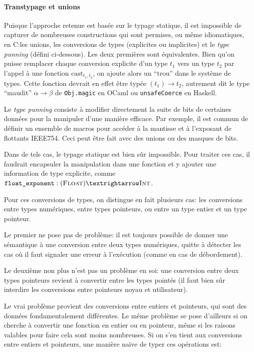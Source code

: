 \paragraph{Transtypage et unions}

Puisque l'approche retenue est basée sur le typage statique, il est impossible
de capturer de nombreuses constructions qui sont permises, ou même idiomatiques,
en C:\@ les unions, les conversions de types (explicites ou implicites) et le
\emph{type punning} (défini ci-dessous). Les deux premières sont équivalentes.
Bien qu'on puisse remplacer chaque conversion explicite d'un type $t_1$ vers un
type $t_2$ par l'appel à une fonction $\mathrm{cast}_{t_1,t_2}$, on ajoute alors
un \enquote{trou} dans le système de types. Cette fonction devrait en effet être
typée $(t_1) → t_2$, autrement dit le type \enquote{maudit} $α → β$ de
\texttt{Obj.magic} en OCaml ou \texttt{unsafeCoerce} en Haskell.

Le \emph{type punning} consiste à modifier directement la suite de bits de
certaines données pour la manipuler d'une manière efficace. Par exemple, il est
commun de définir un ensemble de macros pour accéder à la mantisse et à
l'exposant de flottants IEEE754. Ceci peut être fait avec des unions ou des
masques de bits.

Dans de tels cas, le typage statique est bien sûr impossible. Pour traiter ces
cas, il faudrait encapsuler la manipulation dans une fonction et y ajouter une
information de type explicite, comme $\texttt{float\_exponent} : (\tFloat) →
\tInt$.

Pour ces conversions de types, on distingue en fait plusieurs cas: les
conversions entre types numériques, entre types pointeurs, ou entre un type
entier et un type pointeur.


Le premier ne pose pas de problème: il est toujours possible de donner une
sémantique à une conversion entre deux types numériques, quitte à détecter les
cas où il faut signaler une erreur à l'exécution (comme en cas de débordement).


Le deuxième non plus n'est pas un problème en soi: une conversion entre deux
types pointeurs revient à convertir entre les types pointés (il faut bien
sûr interdire les conversions entre pointeurs noyau et utilisateur).

Le vrai problème provient des conversions entre entiers et pointeurs, qui sont
des données fondamentalement différentes. Le même problème se pose d'ailleurs si
on cherche à convertir une fonction en entier ou en pointeur, même si les
raisons valables pour faire cela sont moins nombreuses.
Si on s'en tient aux conversions entre entiers et pointeurs, une manière naïve
de typer ces opérations est:


